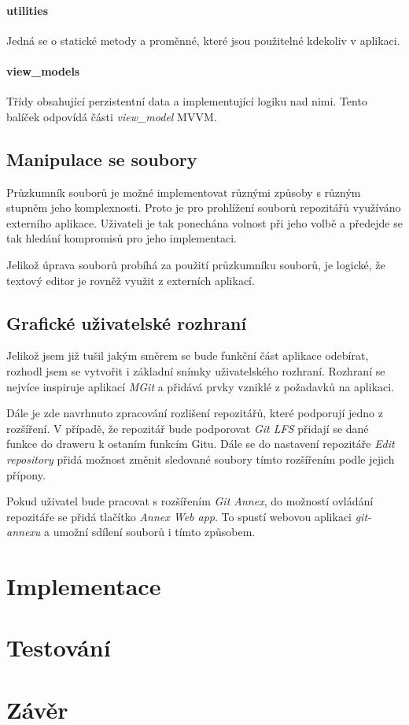         \subsubsection{utilities}
        Jedná se o statické metody a proměnné, které jsou použitelné kdekoliv v aplikaci. 

        \subsubsection{view\_models}
        Třídy obsahující perzistentní data a implementující logiku nad nimi. Tento balíček odpovídá části \emph{view\_model} MVVM.

    \newpage
    \section{Manipulace se soubory}
    Průzkumník souborů je možné implementovat různými způsoby s různým stupněm jeho komplexnosti. Proto je pro prohlížení souborů repozitářů využíváno externího aplikace. Uživateli je tak ponechána volnost při jeho volbě a předejde se tak hledání kompromisů pro jeho implementaci.

    Jelikož úprava souborů probíhá za použití průzkumníku souborů, je logické, že textový editor je rovněž využit z externích aplikací.

    \section{Grafické uživatelské rozhraní}
    Jelikož jsem již tušil jakým směrem se bude funkční část aplikace odebírat, rozhodl jsem se vytvořit i základní snímky uživatelského rozhraní. Rozhraní se nejvíce inspiruje aplikací \emph{MGit} a přidává prvky vzniklé z požadavků na aplikaci.

    Dále je zde navrhnuto zpracování rozlišení repozitářů, které podporují jedno z rozšíření. V případě, že repozitář bude podporovat \emph{Git LFS} přidají se dané funkce do draweru k ostaním funkcím Gitu. Dále se do nastavení repozitáře \emph{Edit repository} přidá možnost změnit sledované soubory tímto rozšířením podle jejich přípony.

    Pokud uživatel bude pracovat s rozšířením \emph{Git Annex}, do možností ovládání repozitáře se přidá tlačítko \emph{Annex Web app}. To spustí webovou aplikaci \emph{git-annexu} a umožní sdílení souborů i tímto způsobem.
\chapter{Implementace}
\chapter{Testování}
\chapter{Závěr}